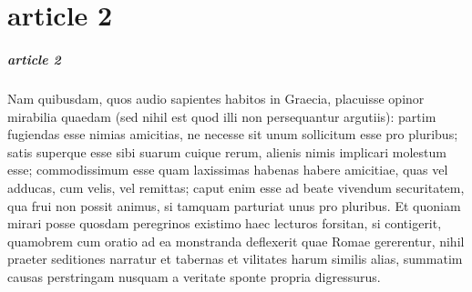 \documentclass[a4paper,11pt]{report}
\begin{document}
\chapter{article 2}
\paragraph{article 2} Nam quibusdam, quos audio sapientes habitos in Graecia, placuisse opinor mirabilia quaedam (sed nihil est quod illi non persequantur argutiis): partim fugiendas esse nimias amicitias, ne necesse sit unum sollicitum esse pro pluribus; satis superque esse sibi suarum cuique rerum, alienis nimis implicari molestum esse; commodissimum esse quam laxissimas habenas habere amicitiae, quas vel adducas, cum velis, vel remittas; caput enim esse ad beate vivendum securitatem, qua frui non possit animus, si tamquam parturiat unus pro pluribus.
Et quoniam mirari posse quosdam peregrinos existimo haec lecturos forsitan, si contigerit, quamobrem cum oratio ad ea monstranda deflexerit quae Romae gererentur, nihil praeter seditiones narratur et tabernas et vilitates harum similis alias, summatim causas perstringam nusquam a veritate sponte propria digressurus.
\end{document}
